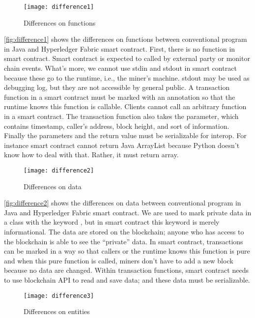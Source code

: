 \begin{figure}[ht]
\centering
\texttt{[image: difference1]}
\caption{Differences on functions}
\label{fig:difference1}
\end{figure}

\autoref{fig:difference1} shows the differences on functions between conventional program in Java and Hyperledger Fabric smart contract.
First, there is no  function in smart contract. Smart contract is expected to called by external party or monitor chain events.
What's more, we cannot use stdin and stdout in smart contract because these go to the runtime, i.e., the miner's machine.
stdout may be used as debugging log, but they are not accessible by general public.
A transaction function in a smart contract must be marked with an annotation so that the runtime knows this function is callable.
Clients cannot call an arbitrary function in a smart contract.
The transaction function also takes the  parameter, which contains timestamp, caller's address, block height, and sort of information.
Finally the parameters and the return value must be serializable for interop.
For instance smart contract cannot return Java ArrayList because Python doesn't know how to deal with that. Rather, it must return array.

\begin{figure}[ht]
\centering
\texttt{[image: difference2]}
\caption{Differences on data}
\label{fig:difference2}
\end{figure}

\autoref{fig:difference2} shows the differences on data between conventional program in Java and Hyperledger Fabric smart contract.
We are used to mark private data in a class with the keyword , but in smart contract this keyword is merely informational.
The data are stored on the blockchain; anyone who has access to the blockchain is able to see the ``private'' data.
In smart contract, transactions can be marked in a way so that callers or the runtime knows this function is pure and when this pure function is called, miners don't have to add a new block because no data are changed.
Within transaction functions, smart contract needs to use blockchain API to read and save data; and these data must be serializable.

\begin{figure}[ht]
\centering
\texttt{[image: difference3]}
\caption{Differences on entities}
\label{fig:difference3}
\end{figure}


